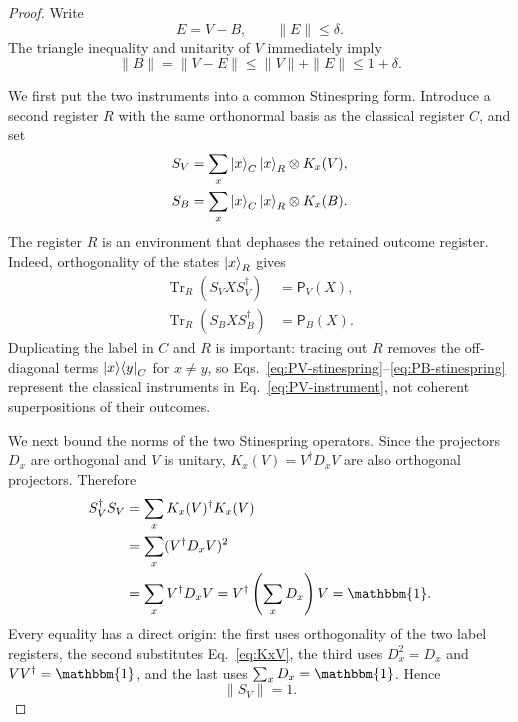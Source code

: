\documentclass[aps,floatfix,10pt,amssymb,amsmath,superscriptaddress,nofootinbib,longbibliography,nobalancelastpage,twocolumn]{revtex4-2}
\newcommand{\id}{\mathbbm{1}}
\newcommand{\Tr}{\operatorname{Tr}}
\begin{document}
\begin{proof}
Write
\begin{equation}
 E=V-B,
 \qquad \|E\|\leq\delta.
 \label{eq:E-def}
\end{equation}
The triangle inequality and unitarity of $V$ immediately imply
\begin{equation}
 \|B\|=\|V-E\|\leq\|V\|+\|E\|
 \leq1+\delta.
 \label{eq:B-norm}
\end{equation}

We first put the two instruments into a common Stinespring form.  Introduce a second register $R$ with the same orthonormal basis as the classical register $C$, and set
\begin{align}
 S_V&=\sum_x\ket{x}_C\ket{x}_R\otimes K_x(V),\label{eq:SV}\\
 S_B&=\sum_x\ket{x}_C\ket{x}_R\otimes K_x(B).
 \label{eq:SB}
\end{align}
The register $R$ is an environment that dephases the retained outcome register.  Indeed, orthogonality of the states $\ket{x}_R$ gives
\begin{align}
 \Tr_R(S_VXS_V^\dagger)&=\mathsf P_V(X),\label{eq:PV-stinespring}\\
 \Tr_R(S_BXS_B^\dagger)&=\mathsf P_B(X).
 \label{eq:PB-stinespring}
\end{align}
Duplicating the label in $C$ and $R$ is important: tracing out $R$ removes the off-diagonal terms $\ket{x}\!\bra{y}_C$ for $x\neq y$, so Eqs.~\eqref{eq:PV-stinespring}--\eqref{eq:PB-stinespring} represent the classical instruments in Eq.~\eqref{eq:PV-instrument}, not coherent superpositions of their outcomes.

We next bound the norms of the two Stinespring operators.  Since the projectors $D_x$ are orthogonal and $V$ is unitary, $K_x(V)=V^\dagger D_xV$ are also orthogonal projectors.  Therefore
\begin{align}
 S_V^\dagger S_V
 &=\sum_xK_x(V)^\dagger K_x(V)\nonumber\\
 &=\sum_x(V^\dagger D_xV)^2\nonumber\\
 &=\sum_xV^\dagger D_xV
 =V^\dagger\left(\sum_xD_x\right)V=\id.
 \label{eq:SV-isometry}
\end{align}
Every equality has a direct origin: the first uses orthogonality of the two label registers, the second substitutes Eq.~\eqref{eq:KxV}, the third uses $D_x^2=D_x$ and $VV^\dagger=\id$, and the last uses $\sum_xD_x=\id$.  Hence
\begin{equation}
 \|S_V\|=1.
 \label{eq:SV-norm}
\end{equation}


\end{proof}
\end{document}
